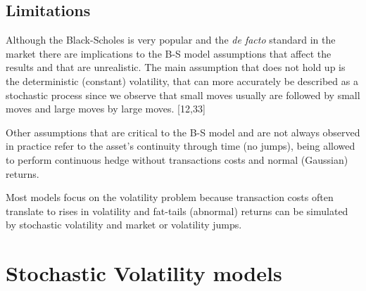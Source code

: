 \documentclass[12pt,twoside]{reedthesis}
\theoremstyle{definition}
\theoremstyle{definition}
\theoremstyle{remark}
\begin{document}
  \subsection{Limitations}\label{limitations}
  
  Although the Black-Scholes is very popular and the \emph{de facto}
  standard in the market there are implications to the B-S model
  assumptions that affect the results and that are unrealistic. The main
  assumption that does not hold up is the deterministic (constant)
  volatility, that can more accurately be described as a stochastic
  process since we observe that small moves usually are followed by small
  moves and large moves by large moves. {[}12,33{]}
  
  Other assumptions that are critical to the B-S model and are not always
  observed in practice refer to the asset's continuity through time (no
  jumps), being allowed to perform continuous hedge without transactions
  costs and normal (Gaussian) returns.
  
  Most models focus on the volatility problem because transaction costs
  often translate to rises in volatility and fat-tails (abnormal) returns
  can be simulated by stochastic volatility and market or volatility
  jumps.
  
  \section{Stochastic Volatility
  models}\label{stochastic-volatility-models}
  
\end{document}
